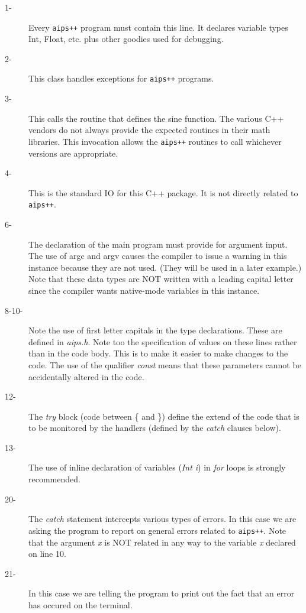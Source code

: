 \begin{description}
\item[1-] Every {\tt aips++} program must contain this line. It declares variable
types Int, Float, etc. plus other goodies used for debugging.


\item[2-] This class handles exceptions for {\tt aips++} programs.


\item[3-] This calls the routine that defines the sine function.  The various C++
vendors do not always provide the expected routines in their math libraries.
This invocation allows the {\tt aips++} routines to call whichever versions are
appropriate.


\item[4-] This is the standard IO for this C++ package. It is not directly
related to {\tt aips++}.


\item[6-] The declaration of the main program must provide for
argument input. The use of argc and argv causes the compiler to issue
a warning in this instance because they are not used. (They will be
used in a later example.)  Note that these data types are NOT written
with a leading capital letter since the compiler wants native-mode
variables in this instance.


\item[8-10-] Note the use of first letter capitals in the type declarations.
These are defined in {\em aips.h}.  Note too the specification of values
on these lines rather than in 
the code body. This is to make it easier to make changes to
the code.  The use of the qualifier {\em const} means that these
parameters cannot be accidentally altered in the code. 

\item[12-] The {\em try} block (code between \{ and \})
define the extend of the code that is to be monitored by the handlers
(defined by the {\em catch} clauses below).

\item[13-] The use of inline declaration of variables ({\em Int i}) in
{\em for} loops is strongly recommended.

\item[20-] The {\em catch} statement intercepts various types of errors. In
this case we are asking the program to report on general errors related
to {\tt aips++}.  Note that the argument {\em x} is NOT related in any way to
the variable {\em x} declared on line 10. 


\item[21-] In this case we are telling the program to print out the fact that
an error has occured on the terminal.
\end{description}


